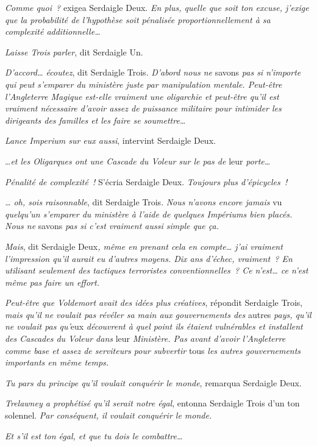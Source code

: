 \emph{Comme quoi~?} exigea Serdaigle Deux.
\emph{En plus, quelle que soit ton excuse, j'exige que la probabilité de l'hypothèse soit pénalisée proportionnellement à sa complexité additionnelle…}

\emph{Laisse Trois parler}, dit Serdaigle Un.

\emph{D'accord… écoutez}, dit Serdaigle Trois.
\emph{D'abord nous ne} savons \emph{pas si n'importe qui peut s'emparer du ministère juste par manipulation mentale.
Peut-être l'Angleterre Magique est-elle vraiment une oligarchie et peut-être qu'il est vraiment nécessaire d'avoir assez de puissance militaire pour intimider les dirigeants des familles et les faire se soumettre…}

\emph{Lance Imperium sur eux aussi}, intervint Serdaigle Deux.

…\emph{et les Oligarques ont une Cascade du Voleur sur le pas de} leur \emph{porte…}

\emph{Pénalité de complexité~!} S'écria Serdaigle Deux.
\emph{Toujours plus d'épicycles~!}

\emph{… oh, sois raisonnable}, dit Serdaigle Trois.
\emph{Nous n'avons encore jamais} vu \emph{quelqu'un s'emparer du ministère à l'aide de quelques Impériums bien placés.
Nous ne} savons \emph{pas si c'est vraiment aussi simple que ça.}

\emph{Mais}, dit Serdaigle Deux\emph{, même en prenant cela en compte… j'ai vraiment l'impression qu'il aurait eu d'autres moyens.
Dix ans d'échec, vraiment~?
En utilisant seulement des tactiques terroristes conventionnelles~?
Ce n'est… ce n'est même pas faire un effort.}

\emph{Peut-être que Voldemort avait des idées plus créatives}, répondit Serdaigle Trois, \emph{mais qu'il ne voulait pas révéler sa main aux gouvernements des} autres \emph{pays, qu'il ne voulait pas qu'}eux \emph{découvrent à quel point ils étaient vulnérables et installent des Cascades du Voleur dans} leur \emph{Ministère.
Pas avant d'avoir l'Angleterre comme base et assez de serviteurs pour subvertir} tous \emph{les autres gouvernements importants en même temps.}

\emph{Tu pars du principe qu'il voulait conquérir le monde}, remarqua Serdaigle Deux.

\emph{Trelawney a prophétisé qu'il serait notre égal}, entonna Serdaigle Trois d'un ton solennel.
\emph{Par conséquent, il voulait conquérir le monde.}

\emph{Et s'il est ton égal, et que tu dois le combattre…}

